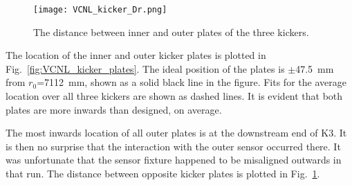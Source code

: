 \begin{figure}[h!]
	\centering
	\texttt{[image: VCNL\_kicker\_Dr.png]}
	\caption{The distance between inner and outer plates of the three kickers.
	}\label{fig:VCNL_kicker_Dr}
\end{figure}



The location of the inner and outer kicker plates is plotted in Fig.~\ref{fig:VCNL_kicker_plates}.
The ideal position of the plates is $\pm$\SI{47.5}{mm} from $r_0$=\SI{7112}{mm}, shown as a solid black line in the figure. 
Fits for the average location over all three kickers are shown as dashed lines. It is evident that both plates are more inwards than designed, on average.



The most inwards location of all outer plates is at the downstream end of K3. 
It is then no surprise that the interaction with the outer sensor occurred there. It was unfortunate that the sensor fixture happened to be misaligned outwards in that run.
The distance between opposite kicker plates is plotted in Fig.~\ref{fig:VCNL_kicker_Dr}.




